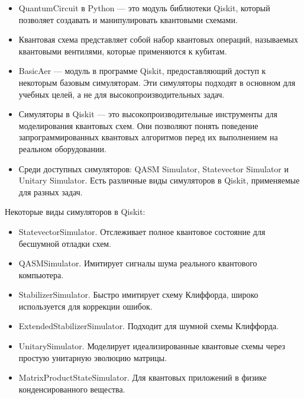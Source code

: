 \documentclass[12pt,a4paper]{article}
\begin{document}
		\begin{itemize}
			
		
		\item QuantumCircuit в Python — это модуль библиотеки Qiskit, который позволяет создавать и манипулировать квантовыми схемами.
		\item Квантовая схема представляет собой набор квантовых операций, называемых квантовыми вентилями, которые применяются к кубитам.

		\item BasicAer — модуль в программе Qiskit, предоставляющий доступ к некоторым базовым симуляторам. Эти симуляторы подходят в основном для учебных целей, а не для высокопроизводительных задач.
	
		\item Симуляторы в Qiskit — это высокопроизводительные инструменты для моделирования квантовых схем. Они позволяют понять поведение запрограммированных квантовых алгоритмов перед их выполнением на реальном оборудовании.
	
		\item Среди доступных симуляторов: QASM Simulator, Statevector Simulator и Unitary Simulator.
		Есть различные виды симуляторов в Qiskit, применяемые для разных задач.
		
		\end{itemize}
		Некоторые виды симуляторов в Qiskit:\\
		\begin{itemize}
		
		\item  StatevectorSimulator. Отслеживает полное квантовое состояние для бесшумной отладки схем.
		
		\item  QASMSimulator. Имитирует сигналы шума реального квантового компьютера. 
		\item StabilizerSimulator. Быстро имитирует схему Клиффорда, широко используется для коррекции ошибок.
		
		\item ExtendedStabilizerSimulator. Подходит для шумной схемы Клиффорда.
		
		\item UnitarySimulator. Моделирует идеализированные квантовые схемы через простую унитарную эволюцию матрицы.
		
		\item MatrixProductStateSimulator. Для квантовых приложений в физике конденсированного вещества.
		\end{itemize}
		
\end{document}
